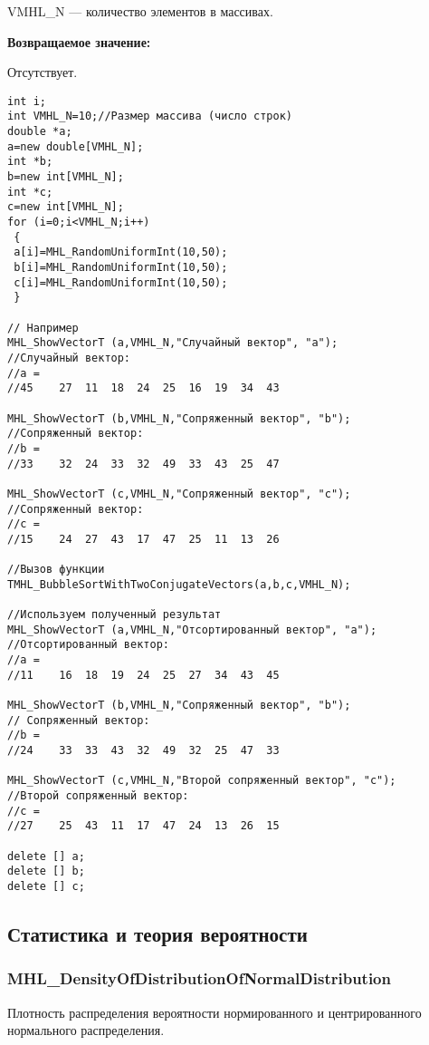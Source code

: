 \documentclass[a4paper,12pt]{article}
\begin{document}
VMHL\_N --- количество элементов в массивах.

\textbf{Возвращаемое значение:}

Отсутствует.


\begin{lstlisting}[label=code_use_TMHL_BubbleSortWithTwoConjugateVectors,caption=Пример использования]
int i;
int VMHL_N=10;//Размер массива (число строк)
double *a;
a=new double[VMHL_N];
int *b;
b=new int[VMHL_N];
int *c;
c=new int[VMHL_N];
for (i=0;i<VMHL_N;i++)
 {
 a[i]=MHL_RandomUniformInt(10,50);
 b[i]=MHL_RandomUniformInt(10,50);
 c[i]=MHL_RandomUniformInt(10,50);
 }

// Например
MHL_ShowVectorT (a,VMHL_N,"Случайный вектор", "a");
//Случайный вектор:
//a =
//45	27	11	18	24	25	16	19	34	43

MHL_ShowVectorT (b,VMHL_N,"Сопряженный вектор", "b");
//Сопряженный вектор:
//b =
//33	32	24	33	32	49	33	43	25	47

MHL_ShowVectorT (c,VMHL_N,"Сопряженный вектор", "c");
//Сопряженный вектор:
//c =
//15	24	27	43	17	47	25	11	13	26

//Вызов функции
TMHL_BubbleSortWithTwoConjugateVectors(a,b,c,VMHL_N);

//Используем полученный результат
MHL_ShowVectorT (a,VMHL_N,"Отсортированный вектор", "a");
//Отсортированный вектор:
//a =
//11	16	18	19	24	25	27	34	43	45

MHL_ShowVectorT (b,VMHL_N,"Сопряженный вектор", "b");
// Сопряженный вектор:
//b =
//24	33	33	43	32	49	32	25	47	33

MHL_ShowVectorT (c,VMHL_N,"Второй сопряженный вектор", "c");
//Второй сопряженный вектор:
//c =
//27	25	43	11	17	47	24	13	26	15

delete [] a;
delete [] b;
delete [] c;
\end{lstlisting}

\subsection{Статистика и теория вероятности}

\subsubsection{MHL\_DensityOfDistributionOfNormalDistribution}\label{MHL_DensityOfDistributionOfNormalDistribution}

Плотность распределения вероятности нормированного и центрированного нормального распределения.
\end{document}
